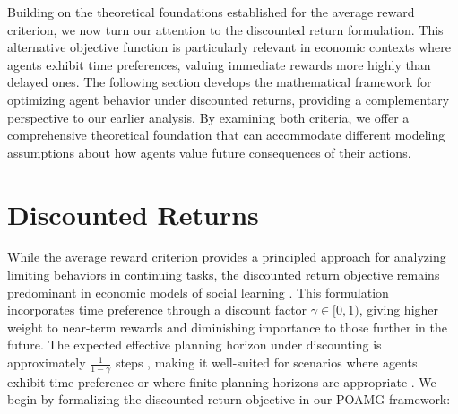 \documentclass[a4paper,12pt]{report}
\begin{document}
Building on the theoretical foundations established for the average reward criterion, we now turn our attention to the discounted return formulation. This alternative objective function is particularly relevant in economic contexts where agents exhibit time preferences, valuing immediate rewards more highly than delayed ones. The following section develops the mathematical framework for optimizing agent behavior under discounted returns, providing a complementary perspective to our earlier analysis. By examining both criteria, we offer a comprehensive theoretical foundation that can accommodate different modeling assumptions about how agents value future consequences of their actions.

\section{Discounted Returns}

While the average reward criterion provides a principled approach for analyzing limiting behaviors in continuing tasks, the discounted return objective remains predominant in economic models of social learning \citep{keller2005strategic, bolton1999strategic, huang2024learning,brandl2024}. This formulation incorporates time preference through a discount factor $\gamma \in [0, 1)$, giving higher weight to near-term rewards and diminishing importance to those further in the future. The expected effective planning horizon under discounting is approximately $\frac{1}{1-\gamma}$ steps \citep{kearns2002near}, making it well-suited for scenarios where agents exhibit time preference or where finite planning horizons are appropriate \citep{frederick2002time, sutton2018reinforcement}. We begin by formalizing the discounted return objective in our POAMG framework:
\end{document}
